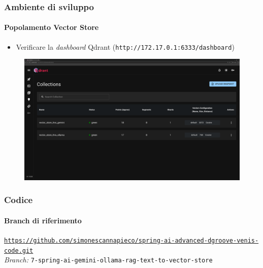 \begin{frame}[t,fragile] \frametitle{Ambiente di sviluppo}
\framesubtitle{Popolamento Vector Store}
	\vspace*{-.5cm}
    {\footnotesize
    \begin{itemize}
        \item[\alert{\faExclamationTriangle}] Verificare la \textit{dashboard} Qdrant (\texttt{http://172.17.0.1:6333/dashboard})
    \end{itemize}
    }
    \vfill
    \begin{minipage}[b]{\textwidth}
		\centering
		    \begin{figure}[ht]
			    \includegraphics[width=\textwidth, frame]{img/qdrant-dashboard.png}
		    \end{figure}
	\end{minipage}
\end{frame}
%
\begin{frame}[fragile] \frametitle{Codice}
    \framesubtitle{Branch di riferimento}
	\begin{center}
		{\scriptsize \href{https://github.com/simonescannapieco/spring-ai-advanced-dgroove-venis-code.git}{\texttt{https://github.com/simonescannapieco/spring-ai-advanced-dgroove-venis-code.git}}}\\
		\textit{Branch:} \alert{\texttt{7-spring-ai-gemini-ollama-rag-text-to-vector-store}}
	\end{center}
\end{frame}